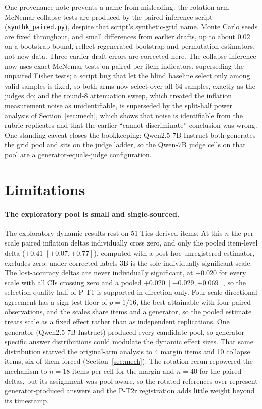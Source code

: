 \documentclass[11pt]{article}
\begin{document}
One provenance note prevents a name from misleading: the rotation-arm McNemar collapse tests are produced by the paired-inference script (\texttt{synthk\_paired.py}), despite that script's synthetic-grid name.
Monte Carlo seeds are fixed throughout, and small differences from earlier drafts, up to about $0.02$ on a bootstrap bound, reflect regenerated bootstrap and permutation estimators, not new data.
Three earlier-draft errors are corrected here.
The collapse inference now uses exact McNemar tests on paired per-item indicators, superseding the unpaired Fisher tests; a script bug that let the blind baseline select only among valid samples is fixed, so both arms now select over all 64 samples, exactly as the judges do; and the round-8 attenuation sweep, which treated the inflation measurement noise as unidentifiable, is superseded by the split-half power analysis of Section~\ref{sec:mech}, which shows that noise is identifiable from the rubric replicates and that the earlier ``cannot discriminate'' conclusion was wrong.
One standing caveat closes the bookkeeping: Qwen2.5-7B-Instruct both generates the grid pool and sits on the judge ladder, so the Qwen-7B judge cells on that pool are a generator-equals-judge configuration.

\FloatBarrier

\section{Limitations}

\paragraph{The exploratory pool is small and single-sourced.}
The exploratory dynamic results rest on 51 Ties-derived items.
At this $n$ the per-scale paired inflation deltas individually cross zero, and only the pooled item-level delta ($+0.41$ $[+0.07, +0.77]$), computed with a post-hoc unregistered estimator, excludes zero; under corrected labels 3B is the sole individually significant scale.
The lost-accuracy deltas are never individually significant, at $+0.020$ for every scale with all CIs crossing zero and a pooled $+0.020$ $[-0.029, +0.069]$, so the selection-quality half of P-T1 is supported in direction only.
Four-scale directional agreement has a sign-test floor of $p = 1/16$, the best attainable with four paired observations, and the scales share items and a generator, so the pooled estimate treats scale as a fixed effect rather than as independent replications.
One generator (Qwen2.5-7B-Instruct) produced every candidate pool, so generator-specific answer distributions could modulate the dynamic effect sizes.
That same distribution starved the original-arm analysis to 4 margin items and 10 collapse items, six of them forced (Section~\ref{sec:mech}).
The rotation rerun repowered the mechanism to $n{=}18$ items per cell for the margin and $n{=}40$ for the paired deltas, but its assignment was pool-aware, so the rotated references over-represent generator-produced answers and the P-T2r registration adds little weight beyond its timestamp.
\end{document}
